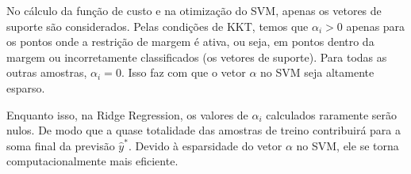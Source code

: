 
No cálculo da função de custo e na otimização do SVM, apenas os vetores de
suporte são considerados. Pelas condições de KKT, temos que $ \alpha_i > 0 $
apenas para os pontos onde a restrição de margem é ativa, ou seja, em pontos dentro
da margem ou incorretamente classificados (os vetores de suporte). Para todas as outras
amostras, $ \alpha_i = 0 $. Isso faz com que o vetor $ \alpha $ no SVM seja
altamente esparso.

Enquanto isso, na Ridge Regression, os valores de $ \alpha_i $ calculados raramente serão nulos.
De modo que a quase totalidade das amostras de treino contribuirá para a
soma final da previsão $ \hat{y}^* $. Devido à esparsidade do vetor
$ \alpha $ no SVM, ele se torna computacionalmente mais eficiente.
